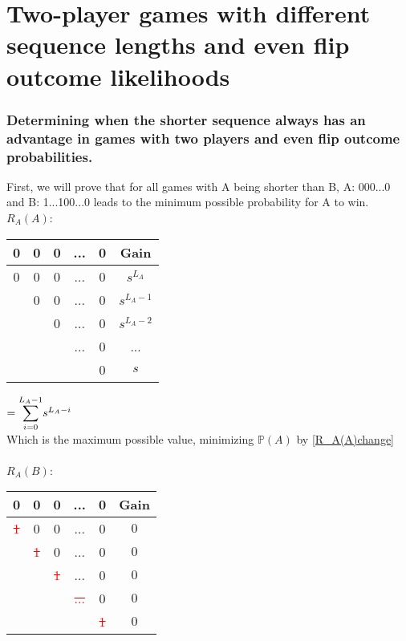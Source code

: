 \documentclass[english,12pt,a4paper,final]{article}
\begin{document}
\part{Two-player games with different sequence lengths and even flip outcome likelihoods}

\section{Determining when the shorter sequence always has an advantage in games with two players and even flip outcome probabilities.}
First, we will prove that for all games with A being shorter than B, A: 000...0 and B: 1...100...0 leads to the minimum possible probability for A to win.
\\
${R_A(A)}$:
\begin{tabular}{|ccccc|c|}
	\hline
	0 & 0 & 0 & ... & 0 & Gain \\
	\hline
	
	\textcolor{OliveGreen}{0} & \textcolor{OliveGreen}{0} & \textcolor{OliveGreen}{0} & \textcolor{OliveGreen}{...} & \textcolor{OliveGreen}{0} & $s^{L_A}$\\
	
	& \textcolor{OliveGreen}{0} & \textcolor{OliveGreen}{0} & \textcolor{OliveGreen}{...} & \textcolor{OliveGreen}{0} & $s^{L_A-1}$\\
	
	&  & \textcolor{OliveGreen}{0} & \textcolor{OliveGreen}{...} & \textcolor{OliveGreen}{0} & $s^{L_A-2}$ \\
	
	&  &  & \textcolor{OliveGreen}{...} & \textcolor{OliveGreen}{0} & ... \\
	
	&  &  &  & \textcolor{OliveGreen}{0} & $s$ \\
	\hline
\end{tabular}
$=\mathlarger\sum_{i=0}^{L_A-1}s^{L_A-i}$
\\
Which is the maximum possible value, minimizing $\mathbb{P}(A)$ by \eqref{R_A(A)change} 
\\\\
${R_A(B)}$:
\begin{tabular}{|ccccc|c|}
	\hline
	0 & 0 & 0 & ... & 0 & Gain \\
	\hline
	
	\textcolor{red}{\sout{1}} & 0 & 0 & ... & 0 & $0$\\
	
	& \textcolor{red}{\sout{1}} & 0 & ... & 0 & $0$\\
	
	&  & \textcolor{red}{\sout{1}} & ... & 0 & $0$\\
	
	&  &  & \textcolor{red}{\sout{...}} & 0 & $0$ \\
	
	&  &  &  & \textcolor{red}{\sout{1}} & $0$ \\
	\hline
\end{tabular}
\end{document}
